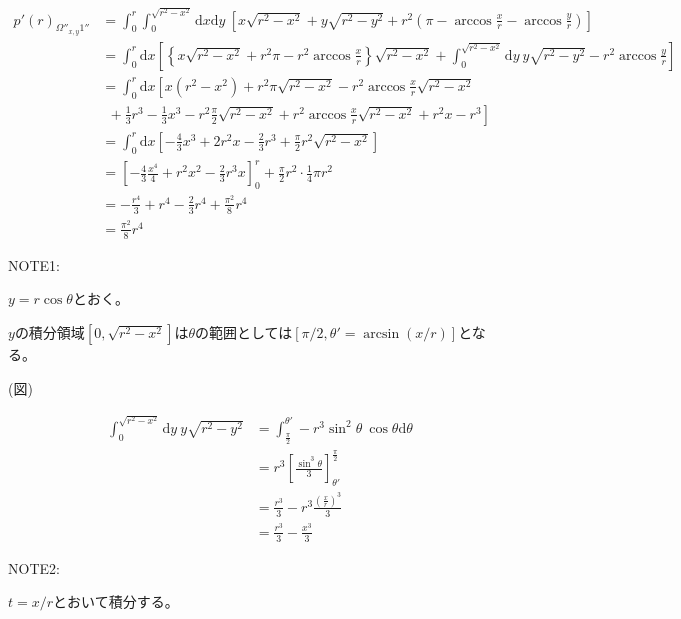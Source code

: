 \begin{align}
p'(r)_{\Omega''_{x,y}1''} &= \int^{r}_{0}\int^{\sqrt{r^{2}-x^{2}}}_{0}\mathrm{d}x\mathrm{d}y\ \left[ x\sqrt{r^{2}-x^{2}} + y \sqrt{r^{2} -y^{2}} + r^{2}\left(\pi -\arccos\frac{x}{r} -\arccos\frac{y}{r}\right) \right]\nonumber \\
&= \int^{r}_{0}\mathrm{d}x\left[ \left\{ x\sqrt{r^{2}-x^{2}} + r^{2}\pi -r^{2}\arccos\frac{x}{r} \right\}\sqrt{r^{2}-x^{2}} + \int^{\sqrt{r^{2}-x^{2}}}_{0}\mathrm{d}y\ y\sqrt{r^{2}-y^{2}} -r^{2}\arccos\frac{y}{r}\right]\nonumber \\
&= \int^{r}_{0}\mathrm{d}x\left[ x(r^{2}-x^{2}) + r^{2}\pi\sqrt{r^{2}-x^{2}} -r^{2}\arccos \frac{x}{r} \sqrt{r^{2}-x^{2}} \right. \nonumber \\
&\ \ +\left.  \frac{1}{3}r^{3} - \frac{1}{3}x^{3} - r^{2}\frac{\pi}{2}\sqrt{r^{2}-x^{2}} + r^{2}\arccos\frac{x}{r}\sqrt{r^{2}-x^{2}} +r^{2}x - r^{3}\right] \nonumber \\
&= \int^{r}_{0}\mathrm{d}x \left[-\frac{4}{3}x^{3} + 2r^{2}x - \frac{2}{3}r^{3} + \frac{\pi}{2}r^{2}\sqrt{r^{2}-x^{2}} \right]\nonumber \\
&= \left[ -\frac{4}{3}\frac{x^{4}}{4} + r^{2}x^{2} - \frac{2}{3}r^{3}x \right]^{r}_{0} + \frac{\pi}{2}r^{2}\cdot \frac{1}{4}\pi r^{2}\nonumber \\
&= -\frac{r^{4}}{3} + r^{4} -\frac{2}{3}r^{4} + \frac{\pi ^{2}}{8}r^{4}\nonumber \\
&= \frac{\pi^{2}}{8}r^{4}
\end{align}

NOTE1:

$y=r\cos \theta$とおく。

$y$の積分領域$[0, \sqrt{r^{2}-x^{2}}]$は$\theta$の範囲としては$[\pi/2, \theta' = \arcsin(x/r)]$となる。

(図)

\begin{align}
\int^{\sqrt{r^{2}-x^{2}}}_{0}\mathrm{d}y\ y\sqrt{r^{2}-y^{2}} &= \int^{\theta'}_{\frac{\pi}{2}}-r^{3}\sin^{2}\theta\ \cos\theta \mathrm{d}\theta\nonumber \\
&= r^{3}\left[ \frac{\sin^{3}\theta}{3} \right]^{\frac{\pi}{2}}_{\theta'}\nonumber \\
&= \frac{r^{3}}{3} - r^{3}\frac{\left( \frac{x}{r} \right)^{3}}{3}\nonumber \\
&= \frac{r^{3}}{3} - \frac{x^{3}}{3}
\end{align}

NOTE2:

$t = x/r$とおいて積分する。

